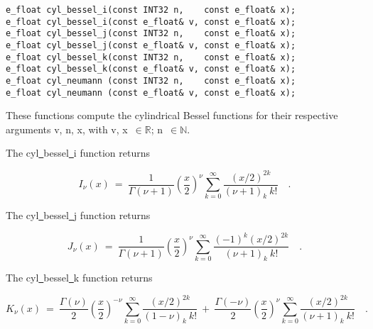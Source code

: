 \begin{lstlisting}
e_float cyl_bessel_i(const INT32 n,    const e_float& x);
e_float cyl_bessel_i(const e_float& v, const e_float& x);
e_float cyl_bessel_j(const INT32 n,    const e_float& x);
e_float cyl_bessel_j(const e_float& v, const e_float& x);
e_float cyl_bessel_k(const INT32 n,    const e_float& x);
e_float cyl_bessel_k(const e_float& v, const e_float& x);
e_float cyl_neumann (const INT32 n,    const e_float& x);
e_float cyl_neumann (const e_float& v, const e_float& x);
\end{lstlisting}

\vspace{6.0pt}

 These functions compute the cylindrical Bessel functions
for their respective arguments {\courier v}, {\courier n}, {\courier x},
with {\courier v}, {\courier x}~$\in\mathbb{R}$;
{\courier n}~$\in\mathbb{N}$.

\vspace{6.0pt}

 The {\courier cyl\underline\ bessel\underline\ i} function
returns~\cite{wolframfunctions:website}

\begin{equation}
I_{\nu}(x) \ = \ \frac{1}{\Gamma(\nu+1)}
\left(\frac{x}{2}\right)^{\nu}
\sum_{k=0}^{\infty} \frac{(x/2)^{2k}}{(\nu+1)_{k}\ k!}\quad.
\end{equation}

\vspace{6.0pt}

 The {\courier cyl\underline\ bessel\underline\ j} function
returns~\cite{wolframfunctions:website}

\begin{equation}
J_{\nu}(x) \ = \ \frac{1}{\Gamma(\nu+1)}
\left(\frac{x}{2}\right)^{\nu}
\sum_{k=0}^{\infty} \frac{(-1)^{k}(x/2)^{2k}}{(\nu+1)_{k}\ k!}\quad.
\end{equation}

\vspace{6.0pt}

 The {\courier cyl\underline\ bessel\underline\ k} function
returns~\cite{wolframfunctions:website}

\begin{equation}
K_{\nu}(x) \ = \ 
\frac{\Gamma(\nu)}{2}\left(\frac{x}{2}\right)^{-\nu}
\sum_{k=0}^{\infty} \frac{(x/2)^{2k}}{(1-\nu)_{k}\ k!}
\ +\ 
\frac{\Gamma(-\nu)}{2}\left(\frac{x}{2}\right)^{\nu}
\sum_{k=0}^{\infty} \frac{(x/2)^{2k}}{(\nu+1)_{k}\ k!}\quad.
\end{equation}

